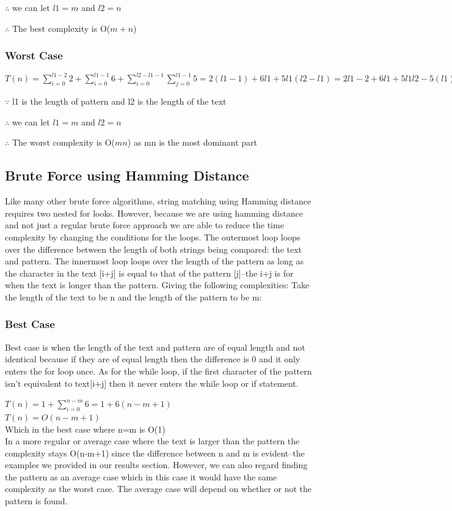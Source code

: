 \documentclass{article}
\theoremstyle{plain}
\begin{document}
$\therefore$ we can let $l1 = m$ and $l2=n$

$\therefore$ The best complexity is O($m+n$)

\subsubsection*{Worst Case}
$T(n)= \sum_{i=0}^{l1-2} 2 + \sum_{i=0}^{l1-1} 6 + \sum_{i=0}^{l2-l1-1} \sum_{j=0}^{l1-1}  5 = 2(l1-1)+6l1+5l1(l2-l1)= 2l1-2+6l1+5l1l2-5(l1)^2$

$\because$ l1 is the length of pattern and l2 is the length of the text

$\therefore$ we can let $l1 = m$ and $l2=n$

$\therefore$ The worst complexity is O($mn$) as mn is the most dominant part
\newpage
\subsection*{Brute Force using Hamming Distance}
Like many other brute force algorithms, string matching using Hamming distance requires two nested for looks. However, because we are using hamming distance and not just a regular brute force approach we are able to reduce the time complexity by changing the conditions for the loops. The outermost loop loops over the difference between the length of both strings being compared: the text and pattern. The innermost loop loops over the length of the pattern as long as the character in the text [i+j] is equal to that of the pattern [j]--the i+j  is for when the text is longer than the pattern. Giving the following complexities:
Take the length of the text to be n and the length of the pattern to be m:
\subsubsection*{Best Case}
Best case is when the length of the text and pattern are of equal length and not identical because if they are of equal length then the difference is 0 and it only enters the for loop once. As for the while loop, if the first character of the pattern isn't equivalent to text[i+j] then it never enters the while loop or if statement.

\noindent $T(n)= 1+ \sum_{i=0}^{n-m} 6 = 1+ 6(n-m+1)$\\
$T(n)= O(n-m+1)$\\
Which in the best case where n=m is O(1)\\
In a more regular or average case where the text is larger than the pattern the complexity stays O(n-m+1) since the difference between n and m is evident--the examples we provided in our results section. However, we can also regard finding the pattern as an average case which in this case it would have the same complexity as the worst case. The average case will depend on whether or not the pattern is found.
\end{document}
